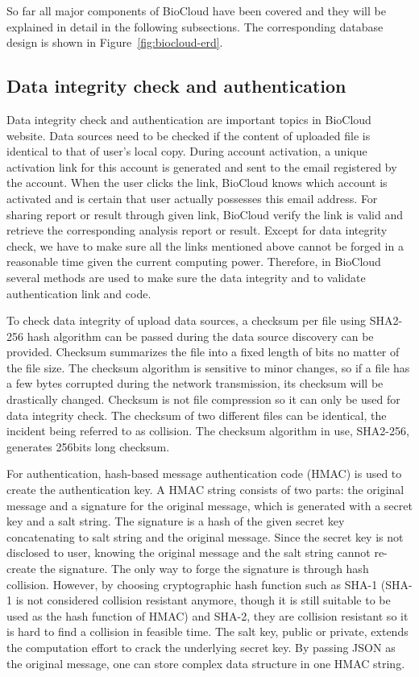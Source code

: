 

So far all major components of BioCloud have been covered and they will be
explained in detail in the following subsections. The corresponding database
design is shown in Figure~\ref{fig:biocloud-erd}.


\subsection{Data integrity check and authentication}

Data integrity check and authentication are important topics in BioCloud
website. Data sources need to be checked if the content of uploaded file is
identical to that of user's local copy. During account activation, a unique
activation link for this account is generated and sent to the email registered
by the account. When the user clicks the link, BioCloud knows which account is
activated and is certain that user actually possesses this email address. For
sharing report or result through given link, BioCloud verify the link is valid
and retrieve the corresponding analysis report or result. Except for data
integrity check, we have to make sure all the links mentioned above cannot be
forged in a reasonable time given the current computing power. Therefore, in
BioCloud several methods are used to make sure the data integrity and to
validate authentication link and code.

To check data integrity of upload data sources, a checksum per file using
SHA2-256 hash algorithm can be passed during the data source discovery can be
provided. Checksum summarizes the file into a fixed length of bits no matter of
the file size. The checksum algorithm is sensitive to minor changes, so if a
file has a few bytes corrupted during the network transmission, its checksum
will be drastically changed. Checksum is not file compression so it can only be
used for data integrity check. The checksum of two different files can be
identical, the incident being referred to as collision. The checksum algorithm
in use, SHA2-256, generates 256bits long checksum.

For authentication, hash-based message authentication code (HMAC) is used to
create the authentication key. A HMAC string consists of two parts: the
original message and a signature for the original message, which is generated
with a secret key and a salt string. The signature is a hash of the given
secret key concatenating to salt string and the original message. Since the
secret key is not disclosed to user, knowing the original message and the salt
string cannot re-create the signature. The only way to forge the signature is
through hash collision. However, by choosing cryptographic hash function such
as SHA-1 (SHA-1 is not considered collision resistant anymore, though it is
still suitable to be used as the hash function of HMAC) and SHA-2, they are
collision resistant so it is hard to find a collision in feasible time. The
salt key, public or private, extends the computation effort to crack the
underlying secret key. By passing JSON as the original message, one can store
complex data structure in one HMAC string.


